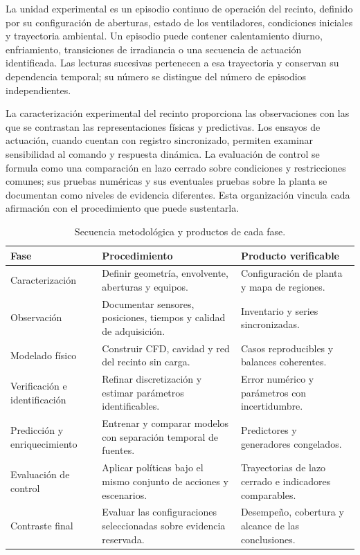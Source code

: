 La unidad experimental es un episodio continuo de operación del recinto, definido por su configuración de aberturas, estado de los ventiladores, condiciones iniciales y trayectoria ambiental. Un episodio puede contener calentamiento diurno, enfriamiento, transiciones de irradiancia o una secuencia de actuación identificada. Las lecturas sucesivas pertenecen a esa trayectoria y conservan su dependencia temporal; su número se distingue del número de episodios independientes.

La caracterización experimental del recinto proporciona las observaciones con las que se contrastan las representaciones físicas y predictivas. Los ensayos de actuación, cuando cuentan con registro sincronizado, permiten examinar sensibilidad al comando y respuesta dinámica. La evaluación de control se formula como una comparación en lazo cerrado sobre condiciones y restricciones comunes; sus pruebas numéricas y sus eventuales pruebas sobre la planta se documentan como niveles de evidencia diferentes. Esta organización vincula cada afirmación con el procedimiento que puede sustentarla.

\begin{table}[htbp]
\centering
\small
\caption{Secuencia metodológica y productos de cada fase.}
\label{met:tabla_fases}
\begingroup
\renewcommand{\arraystretch}{1.30}
\setlength{\tabcolsep}{5pt}
\begin{tabularx}{\textwidth}{>{\raggedright\arraybackslash}p{}>{\raggedright\arraybackslash}p{}>{\raggedright\arraybackslash}X}
\toprule
Fase & Procedimiento & Producto verificable \\
\midrule
Caracterización & Definir geometría, envolvente, aberturas y equipos. & Configuración de planta y mapa de regiones. \\
Observación & Documentar sensores, posiciones, tiempos y calidad de adquisición. & Inventario y series sincronizadas. \\
Modelado físico & Construir CFD, cavidad y red del recinto sin carga. & Casos reproducibles y balances coherentes. \\
Verificación e identificación & Refinar discretización y estimar parámetros identificables. & Error numérico y parámetros con incertidumbre. \\
Predicción y enriquecimiento & Entrenar y comparar modelos con separación temporal de fuentes. & Predictores y generadores congelados. \\
Evaluación de control & Aplicar políticas bajo el mismo conjunto de acciones y escenarios. & Trayectorias de lazo cerrado e indicadores comparables. \\
Contraste final & Evaluar las configuraciones seleccionadas sobre evidencia reservada. & Desempeño, cobertura y alcance de las conclusiones. \\
\bottomrule
\end{tabularx}
\endgroup
\end{table}

